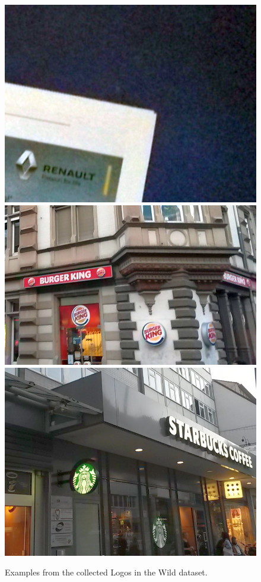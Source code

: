 \documentclass[a4paper,twoside]{article}
\newlength{\frameSize}
\begin{document}
\begin{figure}
\\
\vspace{1.5mm}%
\includegraphics[height=\frameSize]{img/sample15.png}
\hfill
\includegraphics[height=\frameSize]{img/sample5.png}
\hfill
\includegraphics[height=\frameSize]{img/sample9.png}
\caption{Examples from the collected Logos in the Wild dataset.}%
\label{fig:logoSamples}
\end{figure}%
%
\end{document}
